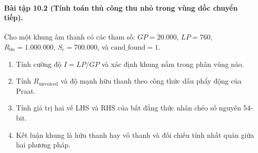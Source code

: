 \paragraph{Bài tập 10.2 (Tính toán thủ công thu nhỏ trong vùng dốc chuyển tiếp).}
Cho một khung âm thanh có các tham số: $GP = 20.000$, $LP = 760$, $R_{0n} = 1.000.000$, $S_c = 700.000$, và $\text{cand\_found} = 1$.
\begin{enumerate}[label=(\alph*)]
    \item Tính cường độ $I = LP / GP$ và xác định khung nằm trong phân vùng nào.
    \item Tính $R_{\text{unvoiced}}$ và độ mạnh hữu thanh theo công thức dấu phẩy động của Praat.
    \item Tính giá trị hai vế LHS và RHS của bất đẳng thức nhân chéo số nguyên 54-bit.
    \item Kết luận khung là hữu thanh hay vô thanh và đối chiếu tính nhất quán giữa hai phương pháp.
\end{enumerate}

